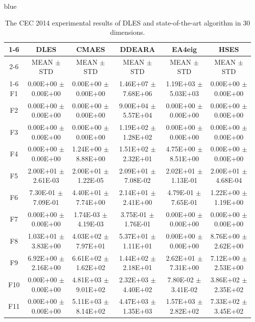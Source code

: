 \documentclass[journal, onecolumn]{IEEEtran}
\begin{document}
\begin{color}{blue}
\begin{table}[htbp!]
	\centering
	\caption{The CEC 2014 experimental results of DLES and state-of-the-art algorithm in 30 dimensions.}
	\label{CEC2014_30}
		\begin{tabular}{c|ccccc}
			\cline{1-6}
			 &	DLES			 &	CMAES				 &	DDEARA				 &	EA4eig				 &	HSES			\\	\cline{2-6}	
		&	MEAN	$\pm$	STD	 &	MEAN	$\pm$	STD		 &	MEAN	$\pm$	STD		 &	MEAN	$\pm$	STD		 &	MEAN	$\pm$	STD	\\	\cline{1-6}	
		F1	 &	0.00E+00	$\pm$	0.00E+00	 &	0.00E+00	$\pm$	0.00E+00		 &	1.46E+07	$\pm$	7.68E+06		 &	1.19E+03	$\pm$	5.03E+03		 &	0.00E+00	$\pm$	0.00E+00	\\		
		F2	 &	0.00E+00	$\pm$	0.00E+00	 &	0.00E+00	$\pm$	0.00E+00		 &	9.00E+04	$\pm$	5.57E+04		 &	0.00E+00	$\pm$	0.00E+00		 &	0.00E+00	$\pm$	0.00E+00	\\		
		F3	 &	0.00E+00	$\pm$	0.00E+00	 &	0.00E+00	$\pm$	0.00E+00		 &	1.19E+02	$\pm$	1.28E+02		 &	0.00E+00	$\pm$	0.00E+00		 &	0.00E+00	$\pm$	0.00E+00	\\		
		F4	 &	0.00E+00	$\pm$	0.00E+00	 &	1.24E+00	$\pm$	8.88E+00		 &	1.51E+02	$\pm$	2.32E+01		 &	4.75E+00	$\pm$	8.51E+00		 &	0.00E+00	$\pm$	0.00E+00	\\		
		F5	 &	2.00E+01	$\pm$	2.61E-03	 &	2.00E+01	$\pm$	1.22E-05		 &	2.09E+01	$\pm$	7.08E-02		 &	2.02E+01	$\pm$	1.13E-01		 &	2.00E+01	$\pm$	4.68E-04	\\		
		F6	 &	7.30E-01	$\pm$	7.09E-01	 &	4.40E+01	$\pm$	7.74E+00		 &	2.14E+01	$\pm$	2.41E+00		 &	4.79E-01	$\pm$	7.65E-01		 &	1.22E+00	$\pm$	1.19E+00	\\		
		F7	 &	0.00E+00	$\pm$	0.00E+00	 &	1.74E-03	$\pm$	4.19E-03		 &	3.75E-01	$\pm$	1.76E-01		 &	0.00E+00	$\pm$	0.00E+00		 &	0.00E+00	$\pm$	0.00E+00	\\		
		F8	 &	1.03E+01	$\pm$	3.83E+00	 &	4.03E+02	$\pm$	7.97E+01		 &	5.37E+01	$\pm$	1.11E+01		 &	0.00E+00	$\pm$	0.00E+00		 &	8.76E+00	$\pm$	2.62E+00	\\		
		F9	 &	6.92E+00	$\pm$	2.16E+00	 &	6.61E+02	$\pm$	1.62E+02		 &	1.44E+02	$\pm$	2.18E+01		 &	2.62E+01	$\pm$	7.31E+00		 &	7.12E+00	$\pm$	2.53E+00	\\		
		F10	 &	0.00E+00	$\pm$	0.00E+00	 &	4.81E+03	$\pm$	9.01E+02		 &	2.32E+03	$\pm$	4.40E+02		 &	7.80E-02	$\pm$	3.41E-02		 &	3.86E+02	$\pm$	2.35E+02	\\		
		F11	 &	0.00E+00	$\pm$	0.00E+00	 &	5.11E+03	$\pm$	8.14E+02		 &	4.47E+03	$\pm$	1.35E+03		 &	1.57E+03	$\pm$	2.82E+02		 &	7.33E+02	$\pm$	3.45E+02	\\		

\end{tabular}
\end{table}
\end{color}
\end{document}
